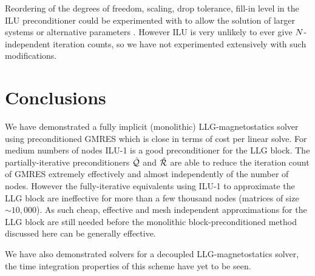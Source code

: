 Reordering of the degrees of freedom, scaling, drop tolerance, fill-in level in the ILU preconditioner could be experimented with to allow the solution of larger systems or alternative parameters \cite[287]{Saad2000}.
However ILU is very unlikely to ever give $N$-independent iteration counts, so we have not experimented extensively with such modifications.


\section{Conclusions}

We have demonstrated a fully implicit (monolithic) LLG-magnetostatics solver using preconditioned GMRES which is close in terms of cost per linear solve.
For medium numbers of nodes ILU-1 is a good preconditioner for the LLG block.
The partially-iterative preconditioners $\hat{\mathcal{Q}}$ and $\hat{\mathcal{R}}$ are able to reduce the iteration count of GMRES extremely effectively and almost independently of the number of nodes.
However the fully-iterative equivalents using ILU-1 to approximate the LLG block are ineffective for more than a few thousand nodes (\ie matrices of size $\sim 10,000$).
As such cheap, effective and mesh independent approximations for the LLG block are still needed before the monolithic block-preconditioned method discussed here can be generally effective.

We have also demonstrated solvers for a decoupled LLG-magnetostatics solver, the time integration properties of this scheme have yet to be seen.




